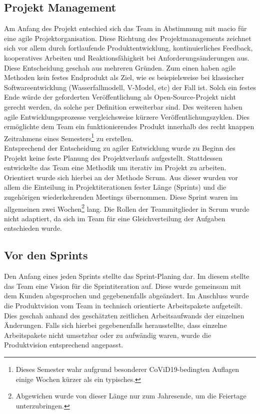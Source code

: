 \documentclass[10pt, a4paper]{article}
\begin{document}
\subsection{Projekt Management}
Am Anfang des Projekt entschied sich das Team in Abstimmung mit macio für eine agile Projektorganisation.
Diese Richtung des Projektmanagements zeichnet sich vor allem durch fortlaufende Produktentwicklung, kontinuierliches Feedback, kooperatives Arbeiten und Reaktionsfähigkeit bei Anforderungsänderungen aus.
Diese Entscheidung geschah aus mehreren Gründen.
Zum einen haben agile Methoden kein festes Endprodukt als Ziel, wie es beispielsweise bei klassischer Softwareentwicklung (Wasserfallmodell, V-Model, etc) der Fall ist.
Solch ein festes Ende würde der geforderten Veröffentlichung als Open-Source-Projekt nicht gerecht werden, da solche per Definition erweiterbar sind.
Des weiteren haben agile Entwicklungsprozesse vergleichsweise kürzere Veröffentlichungszyklen.
Dies ermöglichte dem Team ein funktionierendes Produkt innerhalb des recht knappen Zeitrahmens eines Semesters\footnote{Dieses Semester wahr aufgrund besonderer CoViD19-bedingten Auflagen einige Wochen kürzer als ein typisches.} zu erstellen.
\\
Entsprechend der Entscheidung zu agiler Entwicklung wurde zu Beginn des Projekt keine feste Planung des Projektverlaufs aufgestellt.
Stattdessen entwickelte das Team eine Methodik um iterativ im Projekt zu arbeiten.
Orientiert wurde sich hierbei an der Methode Scrum.
Aus dieser wurden vor allem die Einteilung in Projektiterationen fester Länge (Sprints) und die zugehörigen wiederkehrenden Meetings übernommen.
Diese Sprint waren im allgemeinen zwei Wochen\footnote{Abgewichen wurde von dieser Länge nur zum Jahresende, um die Feiertage unterzubringen.} lang.
Die Rollen der Teammitglieder in Scrum wurde nicht adaptiert, da sich im Team für eine Gleichverteilung der Aufgaben entschieden wurde.

\subsection{Vor den Sprints}
Den Anfang eines jeden Sprints stellte das Sprint-Planing dar.
Im diesem stellte das Team eine Vision für die Sprintiteration auf.
Diese wurde gemeinsam mit dem Kunden abgesprochen und gegebenenfalls abgeändert.
Im Anschluss wurde die Produktvision vom Team in technisch orientierte Arbeitspakete aufgeteilt.
Dies geschah anhand des geschätzten zeitlichen Arbeitsaufwands der einzelnen Änderungen.
Falls sich hierbei gegebenenfalls herausstellte, dass einzelne Arbeitspakete nicht umsetzbar oder zu aufwändig waren, wurde die Produktvision entsprechend angepasst.
\end{document}
